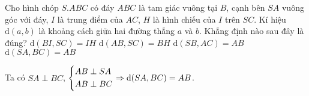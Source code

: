 		\begin{ex}%
			Cho hình chóp $S.ABC$ có đáy $ABC$ là tam giác vuông tại $B$, cạnh bên $SA$ vuông góc với đáy, $I$ là trung điểm của $AC$, $H$ là hình chiếu của $I$ trên $SC$. Kí hiệu $\mathrm{d}(a,b)$ là khoảng cách giữa hai đường thẳng $a$ và $b$. Khẳng định nào sau đây là đúng?
			\choice
			{$\mathrm{d}(BI,SC) = IH$}
			{$\mathrm{d}(AB,SC) = BH$}
			{$\mathrm{d}(SB,AC) = AB$}
			{\True $\mathrm{d}(SA,BC) = AB$}
			\loigiai
			{
				\begin{center}
				\end{center}
				Ta có $SA \perp BC$, $\left\{\begin{aligned}&AB \perp SA \\ &AB \perp BC\end{aligned}\right. \Rightarrow \mathrm{d}(SA,BC) = AB$.
			}
		\end{ex}
		
